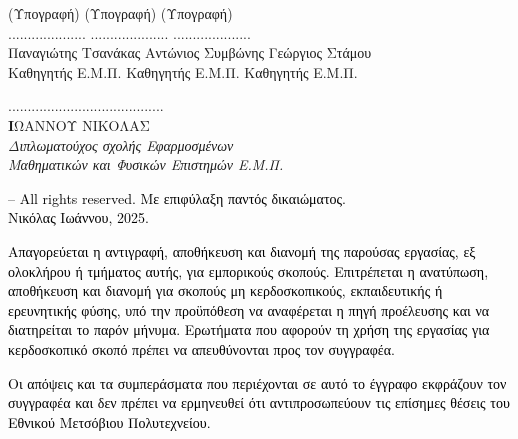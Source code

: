 \documentclass[12pt]{article}
\begin{document}
\begin{center}
{ }

\vspace{2cm}

(Υπογραφή)\hspace*{4cm} (Υπογραφή)\hspace*{4cm} (Υπογραφή)\\
\vspace{0.8 cm} 
.................... \hspace*{4cm} ....................\hspace*{4cm}  ....................\\
Παναγιώτης Τσανάκας\hspace*{2.4cm}  Αντώνιος Συμβώνης\hspace*{3cm}  Γεώργιος Στάμου \\
 Καθηγητής Ε.Μ.Π.\hspace*{3cm} 	 Καθηγητής Ε.Μ.Π.\hspace*{3cm}  Καθηγητής Ε.Μ.Π. 


\vspace{2.9 cm} 






\end{center}

\newpage

\vspace*{\fill}
	{\raggedleft ........................................\\
    \textbf ΙΩΑΝΝΟΥ ΝΙΚΟΛΑΣ\\
    \textit{Διπλωματούχος σχολής Εφαρμοσμένων\\
    Μαθηματικών και Φυσικών Επιστημών Ε.Μ.Π.}
    
    }

\vspace*{\fill}


\vspace{2cm}
{
\small
\noindent \textcolor{black}{\textcopyright{} -- All rights reserved. Με επιφύλαξη παντός δικαιώματος.\\ Νικόλας Ιωάννου, 2025.}\\


\vspace{0.1cm}


\noindent\textcolor{black}{ Απαγορεύεται η αντιγραφή, αποθήκευση και διανομή της παρούσας εργασίας, εξ ολοκλήρου ή τμήματος αυτής, για
εμπορικούς σκοπούς. Επιτρέπεται η ανατύπωση, αποθήκευση και διανομή για σκοπούς μη κερδοσκοπικούς, εκπαιδευτικής
ή ερευνητικής φύσης, υπό την προϋπόθεση να αναφέρεται η πηγή προέλευσης και να διατηρείται το παρόν μήνυμα. Ερωτήματα που αφορούν τη χρήση της εργασίας για κερδοσκοπικό σκοπό πρέπει να απευθύνονται προς τον
συγγραφέα.
}

\vspace{0.1cm}

\noindent \textcolor{black}{ Οι απόψεις και τα συμπεράσματα που περιέχονται σε αυτό το έγγραφο εκφράζουν τον συγγραφέα και δεν πρέπει
να ερμηνευθεί ότι αντιπροσωπεύουν τις επίσημες θέσεις του Εθνικού Μετσόβιου Πολυτεχνείου.}}
\end{document}
